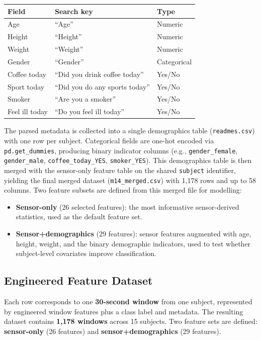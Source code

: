 \documentclass[11pt]{article}
\begin{document}
\begin{center}
\small
\begin{tabular}{lll}
\toprule
\textbf{Field} & \textbf{Search key} & \textbf{Type} \\
\midrule
Age       & ``Age''        & Numeric \\
Height    & ``Height''     & Numeric \\
Weight    & ``Weight''     & Numeric \\
Gender    & ``Gender''     & Categorical \\
Coffee today      & ``Did you drink coffee today''   & Yes/No \\
Sport today       & ``Did you do any sports today''  & Yes/No \\
Smoker            & ``Are you a smoker''             & Yes/No \\
Feel ill today    & ``Do you feel ill today''        & Yes/No \\
\bottomrule
\end{tabular}
\end{center}

The parsed metadata is collected into a single demographics table (\texttt{readmes.csv}) with one row per subject.
Categorical fields are one-hot encoded via \texttt{pd.get\_dummies}, producing binary indicator columns (e.g., \texttt{gender\_female}, \texttt{gender\_male}, \texttt{coffee\_today\_YES}, \texttt{smoker\_YES}).
This demographics table is then merged with the sensor-only feature table on the shared \texttt{subject} identifier, yielding the final merged dataset (\texttt{m14\_merged.csv}) with 1{,}178 rows and up to 58 columns.
Two feature subsets are defined from this merged file for modelling:
\begin{itemize}
    \item \textbf{Sensor-only} (26 selected features): the most informative sensor-derived statistics, used as the default feature set.
    \item \textbf{Sensor+demographics} (29 features): sensor features augmented with age, height, weight, and the binary demographic indicators, used to test whether subject-level covariates improve classification.
\end{itemize}

\subsection{Engineered Feature Dataset}
Each row corresponds to one \textbf{30-second window} from one subject, represented by engineered window features plus a class label and metadata.
The resulting dataset contains \textbf{1{,}178 windows} across 15 subjects.
Two feature sets are defined: \textbf{sensor-only} (26 features) and \textbf{sensor+demographics} (29 features).
\end{document}
